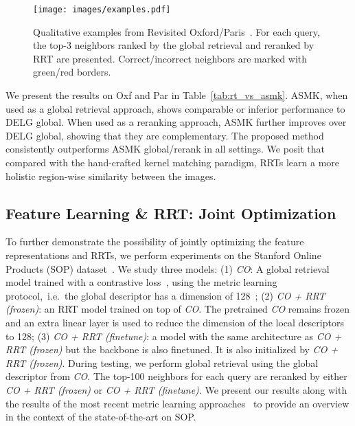 \begin{figure*}[t]
  \centering
  \texttt{[image: images/examples.pdf]}
  \vspace{-0.06in}
  \caption{Qualitative examples from Revisited Oxford/Paris~\cite{revisited}. For each query, the top-3 neighbors ranked by the global retrieval and reranked by RRT are presented. Correct/incorrect neighbors are marked with {\color{green}green}/{\color{red}red} borders.
  \vspace{-0.12in}
  }
  \label{fig:qual}
\end{figure*}

We present the results on Oxf and Par in Table~\ref{tab:rt_vs_asmk}. 
ASMK, when used as a global retrieval approach, shows comparable or inferior performance to DELG global.
When used as a reranking approach, ASMK further improves over DELG global, showing that they are complementary.
The proposed method consistently outperforms ASMK global/rerank in all settings.
We posit that compared with the hand-crafted kernel matching paradigm, RRTs learn a more holistic region-wise similarity between the images.


\subsection{Feature Learning \& RRT: Joint Optimization}
To further demonstrate the possibility of jointly optimizing the feature representations and RRTs, 
we perform experiments on the Stanford Online Products (SOP) dataset~\cite{sop2016}.
We study three models: 
(1) \textit{CO}: A global retrieval model trained with a contrastive loss~\cite{XBM2020}, using the metric learning protocol,~i.e.~the global descriptor has a dimension of 128~\cite{roth2020revisiting,fastap2019,divide2019, MIC2019, XBM2020}; (2) \textit{CO + RRT (frozen)}: an RRT model trained on top of \textit{CO}. 
The pretrained \textit{CO} remains frozen and an extra linear layer is used to reduce the dimension of the local descriptors to 128; 
(3) \textit{CO + RRT (finetune)}: a model with the same architecture as \textit{CO + RRT (frozen)} but the backbone is also finetuned. 
It is also initialized by \textit{CO + RRT (frozen)}. 
During testing, we perform global retrieval using the global descriptor from \textit{CO}.
The top-100 neighbors for each query are reranked by either \textit{CO + RRT (frozen)} or \textit{CO + RRT (finetune)}.
We present our results along with the results of the most recent metric learning approaches~\cite{roth2020revisiting, fastap2019, XBM2020, CE2020} to provide an overview in the context of the state-of-the-art on SOP.

